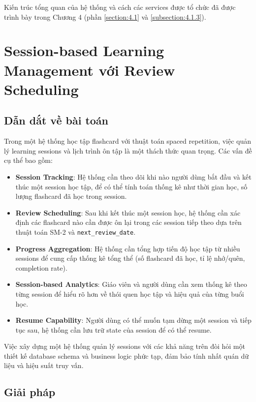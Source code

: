 \documentclass[../DoAn.tex]{subfiles}
\begin{document}
Kiến trúc tổng quan của hệ thống và cách các services được tổ chức đã được trình bày trong Chương 4 (phần \ref{section:4.1} và \ref{subsection:4.1.3}).

\section{Session-based Learning Management với Review Scheduling}
\label{section:5.5}

\subsection{Dẫn dắt về bài toán}
\label{subsection:5.5.1}

Trong một hệ thống học tập flashcard với thuật toán spaced repetition, việc quản lý learning sessions và lịch trình ôn tập là một thách thức quan trọng. Các vấn đề cụ thể bao gồm:

\begin{itemize}
    \item \textbf{Session Tracking}: Hệ thống cần theo dõi khi nào người dùng bắt đầu và kết thúc một session học tập, để có thể tính toán thống kê như thời gian học, số lượng flashcard đã học trong session.
    \item \textbf{Review Scheduling}: Sau khi kết thúc một session học, hệ thống cần xác định các flashcard nào cần được ôn lại trong các session tiếp theo dựa trên thuật toán SM-2 và \texttt{next\_review\_date}.
    \item \textbf{Progress Aggregation}: Hệ thống cần tổng hợp tiến độ học tập từ nhiều sessions để cung cấp thống kê tổng thể (số flashcard đã học, tỉ lệ nhớ/quên, completion rate).
    \item \textbf{Session-based Analytics}: Giáo viên và người dùng cần xem thống kê theo từng session để hiểu rõ hơn về thói quen học tập và hiệu quả của từng buổi học.
    \item \textbf{Resume Capability}: Người dùng có thể muốn tạm dừng một session và tiếp tục sau, hệ thống cần lưu trữ state của session để có thể resume.
\end{itemize}

Việc xây dựng một hệ thống quản lý sessions với các khả năng trên đòi hỏi một thiết kế database schema và business logic phức tạp, đảm bảo tính nhất quán dữ liệu và hiệu suất truy vấn.

\subsection{Giải pháp}
\label{subsection:5.5.2}
\end{document}
